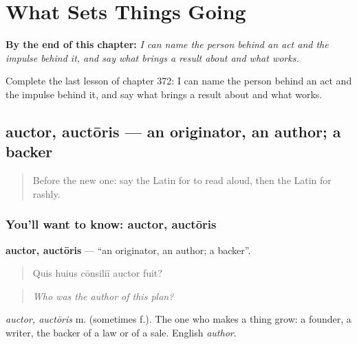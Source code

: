
\chapter{What Sets Things Going}
\label{ch:la-what-sets-things-going}

\begin{chapteropening}
\textbf{By the end of this chapter:} \emph{I can name the person behind an act and the impulse behind it, and say what brings a result about and what works.}

Complete the last lesson of chapter 372: I can name the person behind an act and the impulse behind it, and say what brings a result about and what works.
\end{chapteropening}

\section[auctor, auctōris]{auctor, auctōris — an originator, an author; a backer}

\label{lesson:LA-C372-auctor}



\begin{quote}
Before the new one: say the Latin for to read aloud, then the Latin for rashly.
\end{quote}

\subsection*{You'll want to know: auctor, auctōris}
\textbf{auctor, auctōris} — \textquotedblleft{}an originator, an author; a backer\textquotedblright{}.

\begin{quote}
Quis huius cōnsiliī auctor fuit?
\end{quote}

\begin{quote}
\emph{Who was the author of this plan?}
\end{quote}

\emph{auctor, auctōris} m. (sometimes f.). The one who makes a thing grow: a founder, a writer, the backer of a law or of a sale. English \emph{author}.

